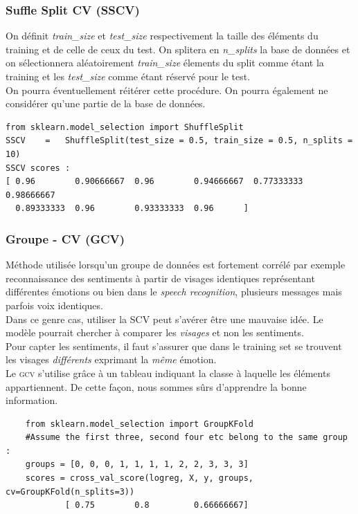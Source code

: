 \documentclass[a4paper,12pt]{report}
\newcommand{\rbk}[1]{\color{red}\textit{#1} \color{black}  
}
\numberwithin{equation}{section} %
\begin{document}
\subsubsection{Suffle Split CV (SSCV)}
On définit \rbk{train\_size} et \rbk{test\_size} respectivement la taille des éléments du training et de celle de ceux du test. On splitera en \rbk{n\_splits} la base de données et on sélectionnera aléatoirement \rbk{train\_size} élements du split comme étant la training  et les \rbk{test\_size} comme étant réservé pour le test.\\
On pourra éventuellement réitérer cette procédure. On pourra également ne considérer qu'une partie de la base de données.
\begin{lstlisting}
from sklearn.model_selection import ShuffleSplit
SSCV	=   ShuffleSplit(test_size = 0.5, train_size = 0.5, n_splits = 10)
SSCV scores : 
[ 0.96        0.90666667  0.96        0.94666667  0.77333333  0.98666667
  0.89333333  0.96        0.93333333  0.96      ]

\end{lstlisting}

\subsubsection{Groupe - CV (GCV)}
Méthode utilisée lorsqu'un groupe de données est fortement corrélé par exemple reconnaissance des sentiments à partir de visages identiques représentant différentes émotions ou bien dans le \textit{speech recognition}, plusieurs messages mais parfois voix identiques.\\
Dans ce genre cas, utiliser la SCV peut s'avérer être une mauvaise idée. Le modèle pourrait chercher à comparer les \textit{visages} et non les sentiments.\\
Pour capter les sentiments, il faut s'assurer que dans le training set se trouvent les visages \textit{différents} exprimant la \textit{même} émotion.\\

\noindent Le \textsc{gcv} s'utilise grâce à un tableau indiquant la classe à laquelle les éléments appartiennent. De cette façon, nous sommes sûrs d'apprendre la bonne information.
\begin{lstlisting}
	from sklearn.model_selection import GroupKFold	
	#Assume the first three, second four etc belong to the same group :
	groups = [0, 0, 0, 1, 1, 1, 1, 2, 2, 3, 3, 3]
	scores = cross_val_score(logreg, X, y, groups, cv=GroupKFold(n_splits=3))
			[ 0.75        0.8         0.66666667]\end{lstlisting}
\end{document}
